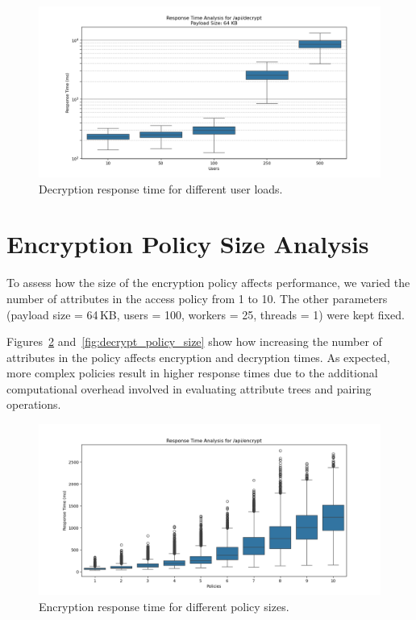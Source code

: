 \documentclass[cic,tc,english]{iiufrgs}
\numberwithin{algorithm}{chapter}
\begin{document}
            \begin{figure}
                \centering
                \includegraphics[width=\textwidth]{images/phase3/response_time_api_decrypt_64KB.png}
                \caption{Decryption response time for different user loads.}
                \label{fig:decrypt_user_load}
            \end{figure}

        \section{Encryption Policy Size Analysis}
        \label{subsec:encryption_policy_size_analysis}

            To assess how the size of the encryption policy affects performance, we varied the number of attributes in the access policy from 1 to 10. The other parameters (payload size = 64\,KB, users = 100, workers = 25, threads = 1) were kept fixed.

            Figures~\ref{fig:encrypt_policy_size} and~\ref{fig:decrypt_policy_size} show how increasing the number of attributes in the policy affects encryption and decryption times. As expected, more complex policies result in higher response times due to the additional computational overhead involved in evaluating attribute trees and pairing operations.

            \begin{figure}
                \centering
                \includegraphics[width=\textwidth]{images/phase4/response_time_api_encrypt.png}
                \caption{Encryption response time for different policy sizes.}
                \label{fig:encrypt_policy_size}
            \end{figure}
\end{document}
